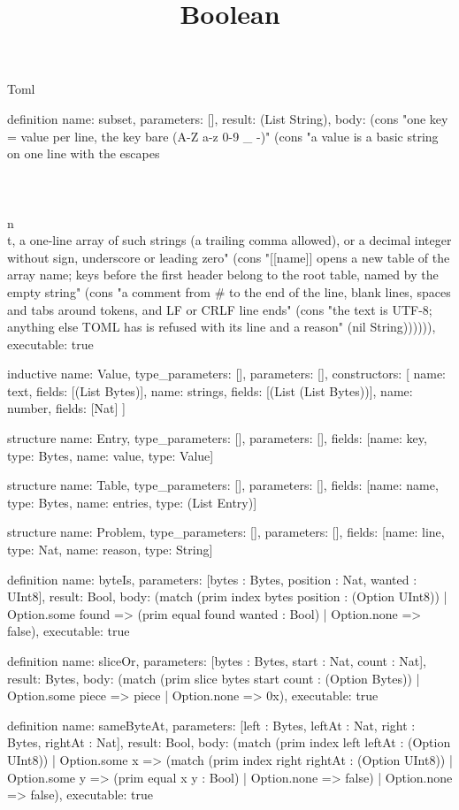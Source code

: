 \begin{lexlean}{Toml}
\title{Boolean}
\begin{semanticmodule}
definition{
  name: subset,
  parameters: [],
  result: (List String),
  body: (cons "one key = value per line, the key bare (A-Z a-z 0-9 _ -)" (cons "a value is a basic string on one line with the escapes \\\" \\\\ \\n \\t, a one-line array of such strings (a trailing comma allowed), or a decimal integer without sign, underscore or leading zero" (cons "[[name]] opens a new table of the array name; keys before the first header belong to the root table, named by the empty string" (cons "a comment from # to the end of the line, blank lines, spaces and tabs around tokens, and LF or CRLF line ends" (cons "the text is UTF-8; anything else TOML has is refused with its line and a reason" (nil String)))))),
  executable: true
}

inductive{
  name: Value,
  type_parameters: [],
  parameters: [],
  constructors: [
    {name: text, fields: [(List Bytes)]},
    {name: strings, fields: [(List (List Bytes))]},
    {name: number, fields: [Nat]}
  ]
}

structure{
  name: Entry,
  type_parameters: [],
  parameters: [],
  fields: [{name: key, type: Bytes}, {name: value, type: Value}]
}

structure{
  name: Table,
  type_parameters: [],
  parameters: [],
  fields: [{name: name, type: Bytes}, {name: entries, type: (List Entry)}]
}

structure{
  name: Problem,
  type_parameters: [],
  parameters: [],
  fields: [{name: line, type: Nat}, {name: reason, type: String}]
}

definition{
  name: byteIs,
  parameters: [bytes : Bytes, position : Nat, wanted : UInt8],
  result: Bool,
  body: (match (prim index bytes position : (Option UInt8))
    | Option.some found => (prim equal found wanted : Bool)
    | Option.none => false),
  executable: true
}

definition{
  name: sliceOr,
  parameters: [bytes : Bytes, start : Nat, count : Nat],
  result: Bytes,
  body: (match (prim slice bytes start count : (Option Bytes))
    | Option.some piece => piece
    | Option.none => 0x),
  executable: true
}

definition{
  name: sameByteAt,
  parameters: [left : Bytes, leftAt : Nat, right : Bytes, rightAt : Nat],
  result: Bool,
  body: (match (prim index left leftAt : (Option UInt8))
    | Option.some x => (match (prim index right rightAt : (Option UInt8))
      | Option.some y => (prim equal x y : Bool)
      | Option.none => false)
    | Option.none => false),
  executable: true
}


\end{semanticmodule}
\end{lexlean}
